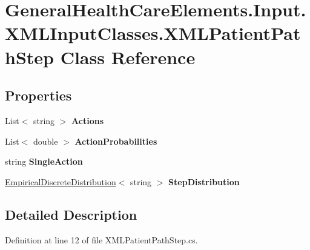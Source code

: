 \hypertarget{class_general_health_care_elements_1_1_input_1_1_x_m_l_input_classes_1_1_x_m_l_patient_path_step}{}\section{General\+Health\+Care\+Elements.\+Input.\+X\+M\+L\+Input\+Classes.\+X\+M\+L\+Patient\+Path\+Step Class Reference}
\label{class_general_health_care_elements_1_1_input_1_1_x_m_l_input_classes_1_1_x_m_l_patient_path_step}
\subsection*{Properties}
\begin{DoxyCompactItemize}
\item 
List$<$ string $>$ {\bfseries Actions}\hypertarget{class_general_health_care_elements_1_1_input_1_1_x_m_l_input_classes_1_1_x_m_l_patient_path_step_a257c4b9dc79464062e9e08a132b6c723}{}\label{class_general_health_care_elements_1_1_input_1_1_x_m_l_input_classes_1_1_x_m_l_patient_path_step_a257c4b9dc79464062e9e08a132b6c723}

\item 
List$<$ double $>$ {\bfseries Action\+Probabilities}\hypertarget{class_general_health_care_elements_1_1_input_1_1_x_m_l_input_classes_1_1_x_m_l_patient_path_step_a7f09be45635640daffe3fe9f4ebbe78b}{}\label{class_general_health_care_elements_1_1_input_1_1_x_m_l_input_classes_1_1_x_m_l_patient_path_step_a7f09be45635640daffe3fe9f4ebbe78b}

\item 
string {\bfseries Single\+Action}\hypertarget{class_general_health_care_elements_1_1_input_1_1_x_m_l_input_classes_1_1_x_m_l_patient_path_step_aa2a63bca74e86dceea714bcfffd87489}{}\label{class_general_health_care_elements_1_1_input_1_1_x_m_l_input_classes_1_1_x_m_l_patient_path_step_aa2a63bca74e86dceea714bcfffd87489}

\item 
\hyperlink{class_simulation_core_1_1_math_tool_1_1_distributions_1_1_empirical_discrete_distribution}{Empirical\+Discrete\+Distribution}$<$ string $>$ {\bfseries Step\+Distribution}\hypertarget{class_general_health_care_elements_1_1_input_1_1_x_m_l_input_classes_1_1_x_m_l_patient_path_step_abdaa2f521712e7d3537000dda8430c65}{}\label{class_general_health_care_elements_1_1_input_1_1_x_m_l_input_classes_1_1_x_m_l_patient_path_step_abdaa2f521712e7d3537000dda8430c65}

\end{DoxyCompactItemize}


\subsection{Detailed Description}


Definition at line 12 of file X\+M\+L\+Patient\+Path\+Step.\+cs.

